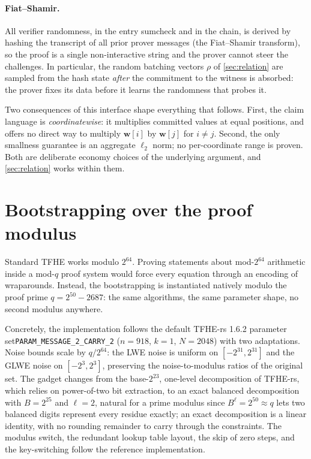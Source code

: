 \documentclass[11pt]{article}
\begin{document}
\paragraph{Fiat--Shamir.} All verifier randomness, in the entry sumcheck and in the chain, is derived by hashing the transcript of all prior prover messages (the Fiat--Shamir transform), so the proof is a single non-interactive string and the prover cannot steer the challenges. In particular, the random batching vectors $\rho$ of \cref{sec:relation} are sampled from the hash state \emph{after} the commitment to the witness is absorbed: the prover fixes its data before it learns the randomness that probes it.

Two consequences of this interface shape everything that follows. First, the claim language is \emph{coordinatewise}: it multiplies committed values at equal positions, and offers no direct way to multiply $\mathbf{w}[i]$ by $\mathbf{w}[j]$ for $i \ne j$. Second, the only smallness guarantee is an aggregate $\ell_2$ norm; no per-coordinate range is proven. Both are deliberate economy choices of the underlying argument, and \cref{sec:relation} works within them.

\section{Bootstrapping over the proof modulus}\label{sec:tfhe}

Standard TFHE works modulo $2^{64}$. Proving statements about mod-$2^{64}$ arithmetic inside a mod-$q$ proof system would force every equation through an encoding of wraparounds. Instead, the bootstrapping is instantiated natively modulo the proof prime $q = 2^{50} - 2687$: the same algorithms, the same parameter shape, no second modulus anywhere.

Concretely, the implementation follows the default TFHE-rs 1.6.2 parameter set\linebreak \texttt{PARAM\_MESSAGE\_2\_CARRY\_2} ($n = 918$, $k = 1$, $N = 2048$) with two adaptations. Noise bounds scale by $q/2^{64}$: the LWE noise is uniform on $[-2^{31}, 2^{31}]$ and the GLWE noise on $[-2^3, 2^3]$, preserving the noise-to-modulus ratios of the original set. The gadget changes from the base-$2^{23}$, one-level decomposition of TFHE-rs, which relies on power-of-two bit extraction, to an exact balanced decomposition with $B = 2^{25}$ and $\ell = 2$, natural for a prime modulus since $B^{\ell} = 2^{50} \approx q$ lets two balanced digits represent every residue exactly; an exact decomposition is a linear identity, with no rounding remainder to carry through the constraints. The modulus switch, the redundant lookup table layout, the skip of zero steps, and the key-switching follow the reference implementation.
\end{document}
